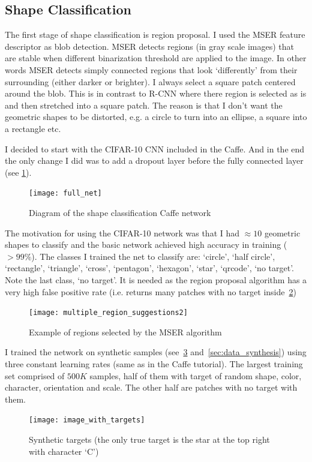 \documentclass{article} %
\begin{document}

\subsection{Shape Classification}
\label{sec:shape_class}

The first stage of shape classification is region proposal. I used the MSER feature
descriptor as blob detection. MSER detects regions (in gray scale images) that are
stable when different binarization threshold are applied to the image. In other
words MSER detects simply connected regions that look `differently' from their
surrounding (either darker or brighter). I always select a square patch centered
around the blob. This is in contrast to R-CNN where there region is selected as is
and then stretched into a square patch. The reason is that I don't want the geometric
shapes to be distorted, e.g. a circle to turn into an ellipse, a square into a rectangle
etc.

I decided to start with the CIFAR-10 CNN included in the Caffe. And in the end the
only change I did was to add a dropout layer before the fully connected layer 
(see \cref{fig:full_net}).
\begin{figure}[h]
	\centering
	\texttt{[image: full\_net]}
	\caption{Diagram of the shape classification Caffe network}
	\label{fig:full_net}
\end{figure}
The motivation for using the CIFAR-10 network was that I had $\approx10$ geometric
shapes to classify and the basic network achieved high accuracy in training ($>99\%$).
The classes I trained the net to classify are: `circle', `half circle', `rectangle',
`triangle', `cross', `pentagon', `hexagon', `star', `qrcode', `no target'. Note the
last class, `no target'. It is needed as the region proposal algorithm has a very high
false positive rate (i.e. returns many patches with no target inside~\cref{fig:multiple_region_suggestions2})
\begin{figure}[h]
	\centering
	\texttt{[image: multiple\_region\_suggestions2]}
	\caption{Example of regions selected by the MSER algorithm}
	\label{fig:multiple_region_suggestions2}
\end{figure}
I trained the network on synthetic samples (see~\cref{fig:image_with_targets} and~\cref{sec:data_synthesis}) using three
constant learning rates (same as in the Caffe tutorial). The largest training set comprised of
$500K$ samples, half of them with target of random shape, color, character, orientation and scale.
The other half are patches with no target with them.
\begin{figure}[h]
	\centering
	\texttt{[image: image\_with\_targets]}
	\caption{Synthetic targets (the only true target is the star at the top right with character `C')}
	\label{fig:image_with_targets}
\end{figure}
\end{document}
